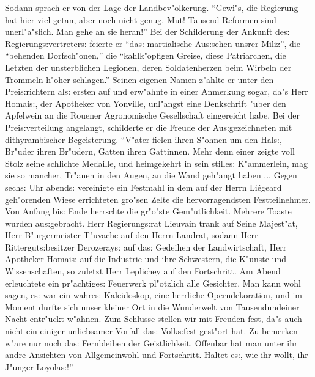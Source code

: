 \documentclass[oneside,12pt]{book}
\newcommand{\s}{s:}%
\begin{document}
Sodann sprach er von der Lage der Landbev"olkerung. "`Gewi"s, die
Regierung hat hier viel getan, aber noch nicht genug. Mut! Tausend
Reformen sind unerl"a"slich. Man gehe an sie heran!"' Bei der
Schilderung der Ankunft de{\s} Regierung{\s}vertreter{\s} feierte
er "`da{\s} martialische Au{\s}sehen unsrer Miliz"', die
"`behenden Dorfsch"onen,"' die "`kahlk"opfigen Greise, diese
Patriarchen, die Letzten der unsterblichen Legionen, deren
Soldatenherzen beim Wirbeln der Trommeln h"oher schlagen."' Seinen
eigenen Namen z"ahlte er unter den Prei{\s}richtern al{\s} ersten
auf und erw"ahnte in einer Anmerkung sogar, da"s Herr Homai{\s},
der Apotheker von Yonville, unl"angst eine Denkschrift "uber den
Apfelwein an die Rouener Agronomische Gesellschaft eingereicht
habe. Bei der Prei{\s}verteilung angelangt, schilderte er die
Freude der Au{\s}gezeichneten mit dithyrambischer Begeisterung.
"`V"ater fielen ihren S"ohnen um den Hal{\s}, Br"uder ihren
Br"udern, Gatten ihren Gattinnen. Mehr denn einer zeigte voll
Stolz seine schlichte Medaille, und heimgekehrt in sein stille{\s}
K"ammerlein, mag sie so mancher, Tr"anen in den Augen, an die Wand
geh"angt haben ... Gegen sech{\s} Uhr abend{\s} vereinigte ein
Festmahl in dem auf der Herrn Li\'egeard geh"orenden Wiese
errichteten gro"sen Zelte die hervorragendsten Festteilnehmer. Von
Anfang bi{\s} Ende herrschte die gr"o"ste Gem"utlichkeit. Mehrere
Toaste wurden au{\s}gebracht. Herr Regierung{\s}rat Lieuvain trank
auf Seine Majest"at, Herr B"urgermeister T"uvache auf den Herrn
Landrat, sodann Herr Rittergut{\s}besitzer Derozeray{\s} auf
da{\s} Gedeihen der Landwirtschaft, Herr Apotheker Homai{\s} auf
die Industrie und ihre Schwestern, die K"unste und Wissenschaften,
so zuletzt Herr Leplichey auf den Fortschritt. Am Abend
erleuchtete ein pr"achtige{\s} Feuerwerk pl"otzlich alle
Gesichter. Man kann wohl sagen, e{\s} war ein wahre{\s}
Kaleidoskop, eine herrliche Operndekoration, und im Moment durfte
sich unser kleiner Ort in die Wunderwelt von Tausendundeiner Nacht
entr"uckt w"ahnen. Zum Schlusse stellen wir mit Freuden fest, da"s
auch nicht ein einiger unliebsamer Vorfall da{\s} Volk{\s}fest
gest"ort hat. Zu bemerken w"are nur noch da{\s} Fernbleiben der
Geistlichkeit. Offenbar hat man unter ihr andre Ansichten von
Allgemeinwohl und Fortschritt. Haltet e{\s}, wie ihr wollt, ihr
J"unger Loyola{\s}!"'


\newpage\begin{center}
{\large \so{Neunte{\s} Kapitel}}\bigskip\bigskip
\end{center}
\end{document}
